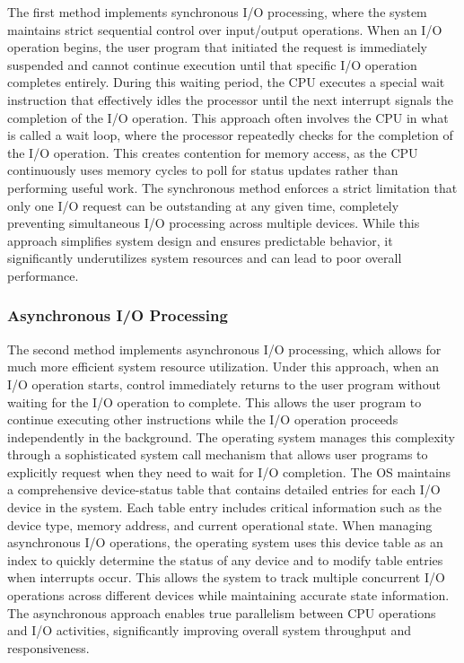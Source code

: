     The first method implements synchronous I/O processing, where the system maintains strict sequential control over input/output operations. When an I/O operation begins, the user program that initiated the request is immediately suspended and cannot continue execution until that specific I/O operation completes entirely. During this waiting period, the CPU executes a special wait instruction that effectively idles the processor until the next interrupt signals the completion of the I/O operation.
    This approach often involves the CPU in what is called a wait loop, where the processor repeatedly checks for the completion of the I/O operation. This creates contention for memory access, as the CPU continuously uses memory cycles to poll for status updates rather than performing useful work. The synchronous method enforces a strict limitation that only one I/O request can be outstanding at any given time, completely preventing simultaneous I/O processing across multiple devices. While this approach simplifies system design and ensures predictable behavior, it significantly underutilizes system resources and can lead to poor overall performance.


    \subsubsection{Asynchronous I/O Processing}

    The second method implements asynchronous I/O processing, which allows for much more efficient system resource utilization. Under this approach, when an I/O operation starts, control immediately returns to the user program without waiting for the I/O operation to complete. This allows the user program to continue executing other instructions while the I/O operation proceeds independently in the background.
    The operating system manages this complexity through a sophisticated system call mechanism that allows user programs to explicitly request when they need to wait for I/O completion. The OS maintains a comprehensive device-status table that contains detailed entries for each I/O device in the system. Each table entry includes critical information such as the device type, memory address, and current operational state.
    When managing asynchronous I/O operations, the operating system uses this device table as an index to quickly determine the status of any device and to modify table entries when interrupts occur. This allows the system to track multiple concurrent I/O operations across different devices while maintaining accurate state information. The asynchronous approach enables true parallelism between CPU operations and I/O activities, significantly improving overall system throughput and responsiveness.


